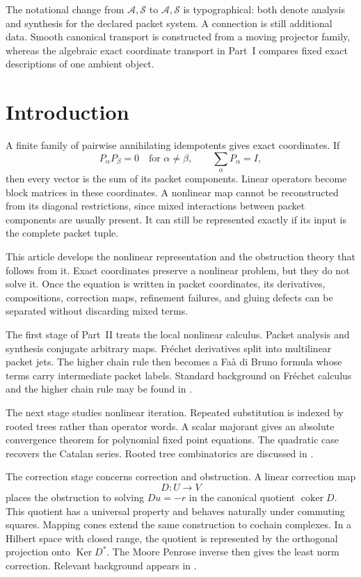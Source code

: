 \documentclass[11pt,a4paper]{article}
\theoremstyle{plain}
\theoremstyle{definition}
\theoremstyle{remark}
\newcommand{\cA}{\mathcal A}
\newcommand{\cS}{\mathcal S}
\newcommand{\Acal}{\mathcal A}
\newcommand{\Scal}{\mathcal S}
\newcommand{\Ker}{\operatorname{Ker}}
\newcommand{\coker}{\operatorname{coker}}
\begin{document}
\medskip\noindent The notational change from \(\cA,\cS\) to \(\Acal,\Scal\) is typographical: both denote analysis and synthesis for the declared packet system. A connection is still additional data. Smooth canonical transport is constructed from a moving projector family, whereas the algebraic exact coordinate transport in Part~I compares fixed exact descriptions of one ambient object.
\section{Introduction}\label{sec:introduction}

A finite family of pairwise annihilating idempotents gives exact coordinates.  If
\[
P_\alpha P_\beta=0
\quad\text{for }\alpha\ne\beta,
\qquad
\sum_\alpha P_\alpha=I,
\]
then every vector is the sum of its packet components.  Linear operators become block matrices in these coordinates.  A nonlinear map cannot be reconstructed from its diagonal restrictions, since mixed interactions between packet components are usually present.  It can still be represented exactly if its input is the complete packet tuple.

This article develops the nonlinear representation and the obstruction theory that follows from it.  Exact coordinates preserve a nonlinear problem, but they do not solve it.  Once the equation is written in packet coordinates, its derivatives, compositions, correction maps, refinement failures, and gluing defects can be separated without discarding mixed terms.

The first stage of Part~II treats the local nonlinear calculus.  Packet analysis and synthesis conjugate arbitrary maps.  Fr\'echet derivatives split into multilinear packet jets.  The higher chain rule then becomes a Fa\`a di Bruno formula whose terms carry intermediate packet labels.  Standard background on Fr\'echet calculus and the higher chain rule may be found in \cite{AbrahamMarsdenRatiu1988,ConstantineSavits1996,Deimling1985}.

The next stage studies nonlinear iteration.  Repeated substitution is indexed by rooted trees rather than operator words.  A scalar majorant gives an absolute convergence theorem for polynomial fixed point equations.  The quadratic case recovers the Catalan series.  Rooted tree combinatorics are discussed in \cite{Stanley2012,LodayVallette2012,HairerLubichWanner2006}.

The correction stage concerns correction and obstruction.  A linear correction map
\[
D:U\longrightarrow V
\]
places the obstruction to solving $Du=-r$ in the canonical quotient $\coker D$.  This quotient has a universal property and behaves naturally under commuting squares.  Mapping cones extend the same construction to cochain complexes.  In a Hilbert space with closed range, the quotient is represented by the orthogonal projection onto $\Ker D^*$.  The Moore Penrose inverse then gives the least norm correction.  Relevant background appears in \cite{Weibel1994,Penrose1955}.
\end{document}
